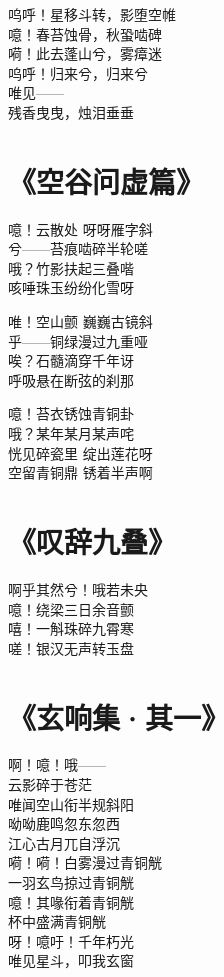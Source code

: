 呜呼！星移斗转，影堕空帷 \\
噫！春苔蚀骨，秋蛩啮碑 \\
嗬！此去蓬山兮，雾瘴迷 \\
呜呼！归来兮，归来兮 \\
唯见—— \\
残香曳曳，烛泪垂垂

\clearpage


\section{《空谷问虚篇》}

噫！云散处 呀呀雁字斜 \\
兮——苔痕啮碎半轮嗟 \\
哦？竹影扶起三叠喈 \\
咳唾珠玉纷纷化雪呀
\vspace{1em}

唯！空山颤 巍巍古镜斜 \\
乎——铜绿漫过九重哑 \\
唉？石髓滴穿千年讶 \\
呼吸悬在断弦的刹那
\vspace{1em}

噫！苔衣锈蚀青铜卦 \\
哦？某年某月某声咤 \\
恍见碎瓷里 绽出莲花呀 \\
空留青铜鼎 锈着半声啊

\clearpage


\section{《叹辞九叠》}

啊乎其然兮！哦若未央 \\
噫！绕梁三日余音颤 \\
嘻！一斛珠碎九霄寒 \\
嗟！银汉无声转玉盘

\clearpage


\section{《玄响集·其一》}

啊！噫！哦—— \\
云影碎于苍茫 \\
唯闻空山衔半规斜阳 \\
呦呦鹿鸣忽东忽西 \\
江心古月兀自浮沉 \\
嗬！嗬！白雾漫过青铜觥 \\
一羽玄鸟掠过青铜觥 \\
噫！其喙衔着青铜觥 \\
杯中盛满青铜觥 \\
呀！噫吁！千年朽光 \\
唯见星斗，叩我玄窗

